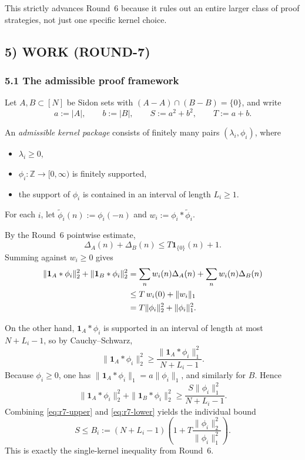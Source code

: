 This strictly advances Round~6 because it rules out an entire larger class of proof strategies, not just one specific kernel choice.

\subsection{5) WORK (ROUND-7)}

\subsubsection{5.1 The admissible proof framework}

Let $A,B\subset[N]$ be Sidon sets with $(A-A)\cap(B-B)=\{0\}$, and write
\[
a:=|A|,\qquad b:=|B|,\qquad S:=a^2+b^2,\qquad T:=a+b.
\]

An \emph{admissible kernel package} consists of finitely many pairs $(\lambda_i,\phi_i)$, where
\begin{itemize}
\item $\lambda_i\ge 0$,
\item $\phi_i:\mathbb Z\to [0,\infty)$ is finitely supported,
\item the support of $\phi_i$ is contained in an interval of length $L_i\ge 1$.
\end{itemize}
For each $i$, let $\widetilde\phi_i(n):=\phi_i(-n)$ and $w_i:=\phi_i*\widetilde\phi_i$.

By the Round~6 pointwise estimate,
\[
\Delta_A(n)+\Delta_B(n)\le T\mathbf 1_{\{0\}}(n)+1.
\]
Summing against $w_i\ge 0$ gives
\begin{align}
\|\mathbf 1_A*\phi_i\|_2^2+\|\mathbf 1_B*\phi_i\|_2^2
&=\sum_n w_i(n)\Delta_A(n)+\sum_n w_i(n)\Delta_B(n)\notag\\
&\le T\,w_i(0)+\|w_i\|_1\notag\\
&=T\|\phi_i\|_2^2+\|\phi_i\|_1^2.
\label{eq:r7-upper}
\end{align}

On the other hand, $\mathbf 1_A*\phi_i$ is supported in an interval of length at most $N+L_i-1$, so by Cauchy--Schwarz,
\[
\|\mathbf 1_A*\phi_i\|_2^2\ge \frac{\|\mathbf 1_A*\phi_i\|_1^2}{N+L_i-1}.
\]
Because $\phi_i\ge 0$, one has $\|\mathbf 1_A*\phi_i\|_1=a\|\phi_i\|_1$, and similarly for $B$.  Hence
\begin{equation}
\label{eq:r7-lower}
\|\mathbf 1_A*\phi_i\|_2^2+\|\mathbf 1_B*\phi_i\|_2^2
\ge \frac{S\|\phi_i\|_1^2}{N+L_i-1}.
\end{equation}
Combining \eqref{eq:r7-upper} and \eqref{eq:r7-lower} yields the individual bound
\begin{equation}
\label{eq:r7-single}
S\le B_i:= (N+L_i-1)\left(1+T\frac{\|\phi_i\|_2^2}{\|\phi_i\|_1^2}\right).
\end{equation}
This is exactly the single-kernel inequality from Round~6.

